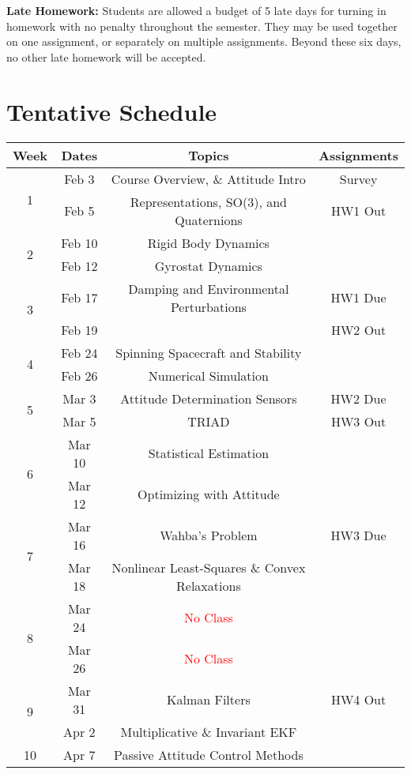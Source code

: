 \documentclass[11pt,letterpaper]{article}
\begin{document}
\textbf{Late Homework:} Students are allowed a budget of 5 late days for turning in homework with no penalty throughout the semester. They may be used together on one assignment, or separately on multiple assignments. Beyond these six days, no other late homework will be accepted.

\section*{Tentative Schedule}

\begin{tabular}{c|c|c|c}
	Week & Dates & Topics & Assignments \\
	\hline
	\multirow{2}{*}{1} & Feb 3 & 
        Course Overview, \& Attitude Intro & Survey \\
	 & Feb 5 & Representations, SO(3), and Quaternions &  HW1 Out\\
	\hline
	\multirow{2}{*}{2} & Feb 10 &
        Rigid Body Dynamics &  \\
	 & Feb 12 & Gyrostat Dynamics &  \\
	\hline
	\multirow{2}{*}{3} & Feb 17 &
        Damping and Environmental Perturbations & HW1 Due \\
	 & Feb 19 &  & HW2 Out \\
	\hline
	\multirow{2}{*}{4}  & Feb 24 &
        Spinning Spacecraft and Stability &  \\
	 & Feb 26 & Numerical Simulation &  \\
	\hline
	\multirow{2}{*}{5}  & Mar 3 &  Attitude Determination Sensors & HW2 Due \\
	 & Mar 5 & TRIAD & HW3 Out \\
	\hline
	\multirow{2}{*}{6}  & Mar 10 & Statistical Estimation &  \\
	 & Mar 12 & Optimizing with Attitude &  \\
	\hline
	\multirow{2}{*}{7}  & Mar 16 & Wahba's Problem
         & HW3 Due \\
	 & Mar 18 & Nonlinear Least-Squares \& Convex Relaxations & \\
	\hline
	\multirow{2}{*}{8}  & Mar 24 & 
        \textcolor{red}{No Class} & \\
	 & Mar 26 & \textcolor{red}{No Class} &   \\
	\hline
	\multirow{2}{*}{9}  & Mar 31 & Kalman Filters
         & HW4 Out \\
	 & Apr 2 & Multiplicative \& Invariant EKF &  \\
	\hline
	\multirow{2}{*}{10}  & Apr 7 & Passive Attitude Control Methods

\end{tabular}
\end{document}
